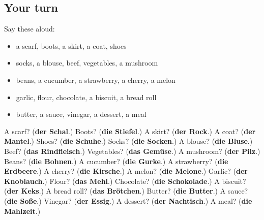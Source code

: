 \subsection*{Your turn}
Say these aloud:

\begin{itemize}
\raggedright
  \item a scarf, boots, a skirt, a coat, shoes
  \item socks, a blouse, beef, vegetables, a mushroom
  \item beans, a cucumber, a strawberry, a cherry, a melon
  \item garlic, flour, chocolate, a biscuit, a bread roll
  \item butter, a sauce, vinegar, a dessert, a meal
\end{itemize}

\begin{tcolorbox}[breakable,colback=teal!4,colframe=teal!35!black,title={Before you move on}]
A scarf? (\textbf{der Schal}.) Boots? (\textbf{die Stiefel}.) A skirt? (\textbf{der Rock}.) A coat? (\textbf{der Mantel}.) Shoes? (\textbf{die Schuhe}.) Socks? (\textbf{die Socken}.) A blouse? (\textbf{die Bluse}.) Beef? (\textbf{das Rindfleisch}.) Vegetables? (\textbf{das Gemüse}.) A mushroom? (\textbf{der Pilz}.) Beans? (\textbf{die Bohnen}.) A cucumber? (\textbf{die Gurke}.) A strawberry? (\textbf{die Erdbeere}.) A cherry? (\textbf{die Kirsche}.) A melon? (\textbf{die Melone}.) Garlic? (\textbf{der Knoblauch}.) Flour? (\textbf{das Mehl}.) Chocolate? (\textbf{die Schokolade}.) A biscuit? (\textbf{der Keks}.) A bread roll? (\textbf{das Brötchen}.) Butter? (\textbf{die Butter}.) A sauce? (\textbf{die Soße}.) Vinegar? (\textbf{der Essig}.) A dessert? (\textbf{der Nachtisch}.) A meal? (\textbf{die Mahlzeit}.)
\end{tcolorbox}
